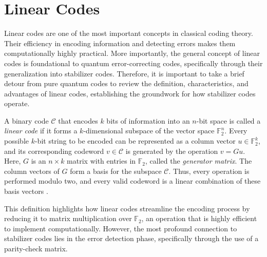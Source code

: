 \chapter{Linear Codes}

Linear codes are one of the most important concepts in classical coding theory. Their efficiency in encoding information and detecting errors makes them computationally highly practical. More importantly, the general concept of linear codes is foundational to quantum error-correcting codes, specifically through their generalization into stabilizer codes. Therefore, it is important to take a brief detour from pure quantum codes to review the definition, characteristics, and advantages of linear codes, establishing the groundwork for how stabilizer codes operate.

\begin{definition}\label{def:linear_code}
  A binary code $\mathcal{C}$ that encodes $k$ bits of information into an $n$-bit space is called a \textit{linear code} if it forms a $k$-dimensional subspace of the vector space $\mathbb{F}^n_2$. Every possible $k$-bit string to be encoded can be represented as a column vector $u \in \mathbb{F}^k_2$, and its corresponding codeword $v \in \mathcal{C}$ is generated by the operation $v = G u$. Here, $G$ is an $n \times k$ matrix with entries in $\mathbb{F}_2$, called the \textit{generator matrix}. The column vectors of $G$ form a basis for the subspace $\mathcal{C}$. Thus, every operation is performed modulo two, and every valid codeword is a linear combination of these basis vectors \citep{Gottesman1998}.
\end{definition}

This definition highlights how linear codes streamline the encoding process by reducing it to matrix multiplication over $\mathbb{F}_2$, an operation that is highly efficient to implement computationally. However, the most profound connection to stabilizer codes lies in the error detection phase, specifically through the use of a parity-check matrix.

